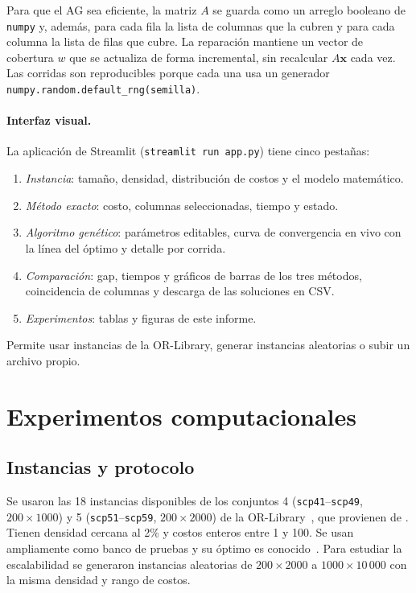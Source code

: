 \documentclass[11pt,a4paper]{article}
\begin{document}
Para que el AG sea eficiente, la matriz $A$ se guarda como un arreglo booleano de \texttt{numpy} y,
además, para cada fila la lista de columnas que la cubren y para cada columna la lista de filas que
cubre. La reparación mantiene un vector de cobertura $w$ que se actualiza de forma incremental, sin
recalcular $A\mathbf{x}$ cada vez. Las corridas son reproducibles porque cada una usa un generador
\texttt{numpy.random.default\_rng(semilla)}.

\paragraph{Interfaz visual.} La aplicación de Streamlit (\texttt{streamlit run app.py}) tiene cinco
pestañas:
\begin{enumerate}[nosep]
  \item \emph{Instancia}: tamaño, densidad, distribución de costos y el modelo matemático.
  \item \emph{Método exacto}: costo, columnas seleccionadas, tiempo y estado.
  \item \emph{Algoritmo genético}: parámetros editables, curva de convergencia en vivo con la línea del
  óptimo y detalle por corrida.
  \item \emph{Comparación}: gap, tiempos y gráficos de barras de los tres métodos, coincidencia de
  columnas y descarga de las soluciones en CSV.
  \item \emph{Experimentos}: tablas y figuras de este informe.
\end{enumerate}
Permite usar instancias de la OR-Library, generar instancias aleatorias o subir un archivo propio.

\section{Experimentos computacionales}
\subsection{Instancias y protocolo}
Se usaron las 18 instancias disponibles de los conjuntos 4 (\texttt{scp41}--\texttt{scp49},
$200\times1000$) y 5 (\texttt{scp51}--\texttt{scp59}, $200\times2000$) de la
OR-Library~\citep{beasley1990orlib}, que provienen de \citet{balas1980}. Tienen densidad cercana
al 2\% y costos enteros entre 1 y 100. Se usan ampliamente como banco de pruebas y su óptimo es
conocido~\citep{beasley1996ga}. Para estudiar la escalabilidad se generaron instancias aleatorias de
$200\times2000$ a $1000\times10\,000$ con la misma densidad y rango de costos.
\end{document}
